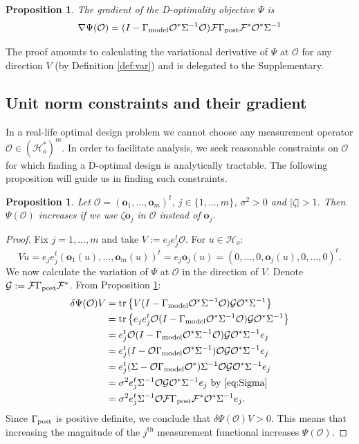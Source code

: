 \documentclass[ba]{imsart}
\newcommand{\hilo}{\mathcal{H}_o}
\newcommand{\obs}{\mathcal{O}}
\newcommand{\fwd}{\mathcal{F}}
\newcommand{\tar}{\Psi}
\newcommand{\meas}{\mathbf{o}}
\newcommand{\tr}[1]{\textup{tr}\left \{#1 \right \} }
\theoremstyle{plain}
\newtheorem{proposition}[theorem]{Proposition}
\theoremstyle{definition}
\theoremstyle{remark}
\begin{document}
\begin{proposition}\label{prop:tar_grad}
  The gradient of the D-optimality objective $\tar$ is
  \begin{equation*}
\nabla \tar(\obs) = ( I - \modcov \obs^* \Sigma^{-1}\obs ) \fwd
    \postcov \fwd^* \obs^* \Sigma^{-1}
  \end{equation*}
\end{proposition}

The proof amounts to calculating the variational derivative of $\tar$
at $\obs$ for any direction $V$ (by Definition \ref{def:var}) and is
delegated to the Supplementary.


\subsection{Unit norm constraints and their gradient}
In a real-life optimal design problem we cannot choose any measurement
operator $\obs \in (\hilo^*)^m$. In order to facilitate analysis, we
seek reasonable constraints on $\obs$ for which finding a D-optimal
design is analytically tractable. The following proposition will guide
us in finding such constraints.

\begin{proposition}\label{prop:bigger_better}
  Let $\obs = (\meas_1,\dots,\meas_m)^t$, $j \in \{1,\dots,m\}$,
  $\sigma^2 > 0$ and $|\zeta| > 1$. Then $\tar(\obs)$ increases if we
  use $\zeta \meas_j$ in $\obs$ instead of $\meas_j$.
\end{proposition}

\begin{proof} 
  Fix $j=1,\dots,m$ and take $V:= e_j e_j^t \obs$. For $u
  \in \hilo$:
  \begin{equation*}
    Vu = e_je_j^t (\meas_1(u),\dots,\meas_m(u) )^t = e_j \meas_j(u)
    = (0,\dots,0,\meas_j(u),0,\dots,0)^t.
  \end{equation*}
We now calculate the variation of $\tar$ at $\obs$ in the direction
  of $V$. Denote $\tmp: = \fwd \postcov \fwd^*$. From Proposition
  \ref{prop:tar_grad}:
  \begin{align*}
     \delta \tar(\obs) V 
    &= \tr{V ( I - \modcov \obs^*\Sigma^{-1}\obs) \tmp \obs^* \Sigma^{-1}} \\
&= \tr{e_je_j^t \obs ( I - \modcov \obs^*\Sigma^{-1}\obs) \tmp \obs^* \Sigma^{-1}} \\
&= e_j^t \obs ( I - \modcov \obs^*\Sigma^{-1}\obs) \tmp \obs^* \Sigma^{-1}e_j \\
&= e_j^t ( I - \obs \modcov \obs^*\Sigma^{-1})\obs \tmp \obs^* \Sigma^{-1}e_j \\  
&=  e_j^t(\Sigma-\obs \modcov \obs^*) \Sigma^{-1}\obs \tmp \obs^* \Sigma^{-1}e_j \\
&=\sigma^2 e_j^t \Sigma^{-1}\obs \tmp \obs^* \Sigma^{-1}e_j
    \text{ by \eqref{eq:Sigma} }\\
&=\sigma^2 e_j^t \Sigma^{-1}\obs \fwd \postcov \fwd^* \obs^* \Sigma^{-1}e_j.
  \end{align*} 
  Since $\Gamma_{\textup{post}}$ is positive definite, we conclude that $\delta
  \tar(\obs) V > 0$. This means that increasing the magnitude of the
  $j^{\text{th}}$ measurement functional increases $\tar(\obs)$.
\end{proof}
\end{document}
